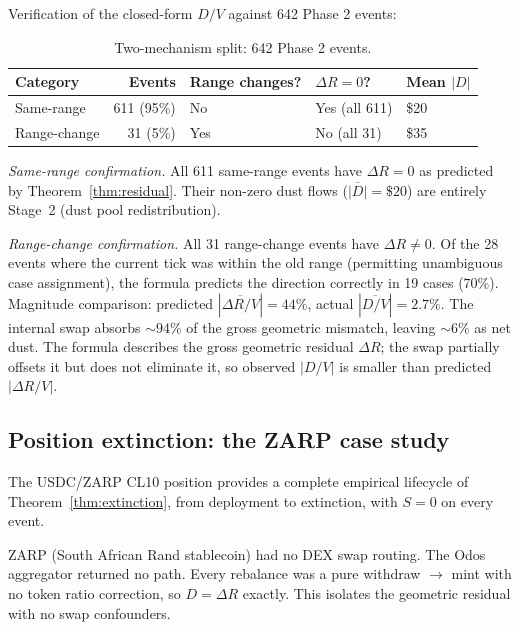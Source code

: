 \documentclass[11pt,a4paper]{article}
\begin{document}
Verification of the closed-form $D/V$ against 642 Phase 2 events:

\begin{table}[H]
\centering
\caption{Two-mechanism split: 642 Phase 2 events.}\label{tab:two-mech}
\begin{tabular}{@{}lrlll@{}}
\toprule
Category     & Events     & Range changes? & $\Delta R = 0$? & Mean $|D|$ \\
\midrule
Same-range   & 611 (95\%) & No             & Yes (all 611)    & \$20 \\
Range-change & 31 (5\%)   & Yes            & No (all 31)      & \$35 \\
\bottomrule
\end{tabular}
\end{table}

\emph{Same-range confirmation.} All 611 same-range events have $\Delta R = 0$ as predicted by Theorem~\ref{thm:residual}. Their non-zero dust flows ($\overline{|D|} = \$20$) are entirely Stage~2 (dust pool redistribution).

\emph{Range-change confirmation.} All 31 range-change events have $\Delta R \neq 0$. Of the 28 events where the current tick was within the old range (permitting unambiguous case assignment), the formula predicts the direction correctly in 19 cases ($70\%$). Magnitude comparison: predicted $|\overline{\Delta R/V}| = 44\%$, actual $|\overline{D/V}| = 2.7\%$. The internal swap absorbs ${\sim}94\%$ of the gross geometric mismatch, leaving ${\sim}6\%$ as net dust. The formula describes the gross geometric residual $\Delta R$; the swap partially offsets it but does not eliminate it, so observed $|D/V|$ is smaller than predicted $|\Delta R/V|$.

\subsection{Position extinction: the ZARP case study}\label{sec:zarp}

The USDC/ZARP CL10 position provides a complete empirical lifecycle of Theorem~\ref{thm:extinction}, from deployment to extinction, with $S = 0$ on every event.

ZARP (South African Rand stablecoin) had no DEX swap routing. The Odos aggregator returned no path. Every rebalance was a pure withdraw $\to$ mint with no token ratio correction, so $D = \Delta R$ exactly. This isolates the geometric residual with no swap confounders.
\end{document}
